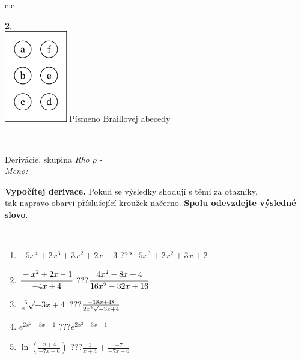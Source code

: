 \documentclass[10pt]{report}
\begin{document}
\begin{tabular}{c:c}
\begin{minipage}[c][104.5mm][t]{0.5\linewidth}
\begin{center}
\begin{minipage}{0.20\linewidth}
\begin{center}
{\Huge\bfseries 2.} \\[2mm]
\includegraphics[height=40mm]{../images/braille.png}
{\small Písmeno Braillovej abecedy}
\end{center}
\end{minipage}
\end{center}
\end{minipage}
\\ \hdashline
\begin{minipage}[c][104.5mm][t]{0.5\linewidth}
\begin{center}
\vspace{7mm}
{\huge Derivácie, skupina \textit{Rho $\rho$} -}\\[5mm]
\textit{Meno:}\phantom{xxxxxxxxxxxxxxxxxxxxxxxxxxxxxxxxxxxxxxxxxxxxxxxxxxxxxxxxxxxxxxxxx}\\[5mm]
\begin{minipage}{0.95\linewidth}
\begin{center}
\textbf{Vypočítej derivace.} Pokud se výsledky shodují s těmi za otazníky,\\tak napravo obarvi příslušející kroužek načerno. \textbf{Spolu odevzdejte výsledné slovo}.
\end{center}
\end{minipage}
\\[1mm]
\begin{minipage}{0.79\linewidth}
\begin{center}
\begin{varwidth}{\linewidth}
\begin{enumerate}
\normalsize
\item $-5x^4+2x^3+3x^2+2x-3$\quad \dotfill\; ???\;\dotfill \quad $-5x^3+2x^2+3x+2$
\item $\cfrac{-x^2+2x-1}{-4x+4}$\quad \dotfill\; ???\;\dotfill \quad $\cfrac{4x^2-8x+4}{16x^2-32x+16}$
\item $\frac{-6}{x}\sqrt{-3x+4}$\quad \dotfill\; ???\;\dotfill \quad $\frac{-18x+48}{2x^2 \sqrt{\smash[b]{-3x+4}}}$
\item $e^{2x^2+3x-1}$\quad \dotfill\; ???\;\dotfill \quad $e^{2x^2+3x-1}$
\item $\ln{\left(\frac{x+4}{-7x+6}\right)}$\quad \dotfill\; ???\;\dotfill \quad $\frac{1}{x+4}+\frac{-7}{-7x+6}$

\end{enumerate}
\end{varwidth}
\end{center}
\end{minipage}
\end{center}
\end{minipage}
\end{tabular}
\end{document}
